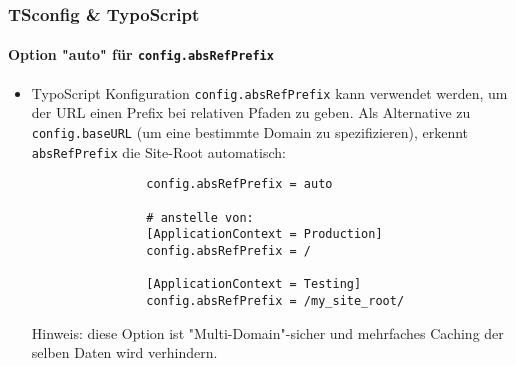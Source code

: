 \begin{frame}[fragile]
	\frametitle{TSconfig \& TypoScript}
	\framesubtitle{Option "auto" für \texttt{config.absRefPrefix}}

	\begin{itemize}
		\item TypoScript Konfiguration \texttt{config.absRefPrefix} kann verwendet werden,
			um der URL einen Prefix bei relativen Pfaden zu geben. Als Alternative zu
			\texttt{config.baseURL} (um eine bestimmte Domain zu spezifizieren),
			erkennt \texttt{absRefPrefix} die Site-Root automatisch:

			\begin{lstlisting}
				config.absRefPrefix = auto

				# anstelle von:
				[ApplicationContext = Production]
				config.absRefPrefix = /

				[ApplicationContext = Testing]
				config.absRefPrefix = /my_site_root/
			\end{lstlisting}

		\smaller
			Hinweis: diese Option ist "Multi-Domain"-sicher und mehrfaches
			Caching der selben Daten wird verhindern.
		\normalsize

	\end{itemize}

\end{frame}


